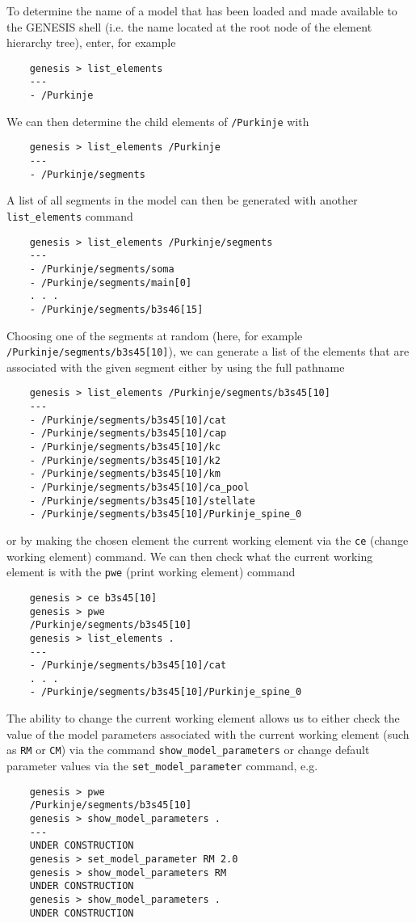 \documentclass[12pt]{article}
\begin{document}
To determine the name of a model that has been loaded and made available to the GENESIS shell (i.e. the name located at the root node of the element hierarchy tree), enter, for example 
\begin{verbatim}
    genesis > list_elements
    ---
    - /Purkinje
\end{verbatim}
We can then determine the child elements of {\tt /Purkinje} with
\begin{verbatim}
    genesis > list_elements /Purkinje
    ---
    - /Purkinje/segments
\end{verbatim}
A list of all segments in the model can then be generated with another {\tt list\_elements} command
\begin{verbatim}
    genesis > list_elements /Purkinje/segments
    ---
    - /Purkinje/segments/soma
    - /Purkinje/segments/main[0]
    . . .
    - /Purkinje/segments/b3s46[15]
\end{verbatim}
Choosing one of the segments at random (here, for example {\tt /Purkinje/segments/b3s45[10]}), we can generate a list of the elements that are associated with the given segment either by using the full pathname
\begin{verbatim}
    genesis > list_elements /Purkinje/segments/b3s45[10]
    ---
    - /Purkinje/segments/b3s45[10]/cat
    - /Purkinje/segments/b3s45[10]/cap
    - /Purkinje/segments/b3s45[10]/kc
    - /Purkinje/segments/b3s45[10]/k2
    - /Purkinje/segments/b3s45[10]/km
    - /Purkinje/segments/b3s45[10]/ca_pool
    - /Purkinje/segments/b3s45[10]/stellate
    - /Purkinje/segments/b3s45[10]/Purkinje_spine_0
\end{verbatim}
or by making the chosen element the current working element via the {\tt ce} (change working element) command. We can then check what the current working element is with the {\tt pwe} (print working element) command
\begin{verbatim}
    genesis > ce b3s45[10]
    genesis > pwe
    /Purkinje/segments/b3s45[10]
    genesis > list_elements .
    ---
    - /Purkinje/segments/b3s45[10]/cat
    . . .
    - /Purkinje/segments/b3s45[10]/Purkinje_spine_0
\end{verbatim}
The ability to change the current working element allows us to either check the value of the model parameters associated with the current working element (such as {\tt RM} or {\tt CM}) via the command {\tt show\_model\_parameters} or change default parameter values via the {\tt set\_model\_parameter} command, e.g.
\begin{verbatim}
    genesis > pwe
    /Purkinje/segments/b3s45[10]
    genesis > show_model_parameters .
    ---
    UNDER CONSTRUCTION
    genesis > set_model_parameter RM 2.0
    genesis > show_model_parameters RM
    UNDER CONSTRUCTION
    genesis > show_model_parameters .
    UNDER CONSTRUCTION
\end{verbatim}
\end{document}
